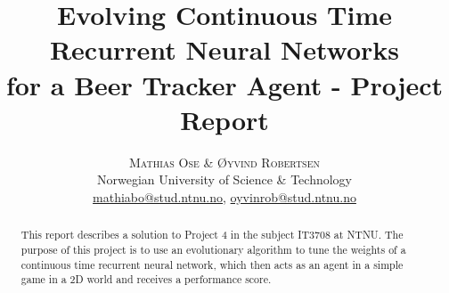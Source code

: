 \documentclass[twoside]{article}
\title{\vspace{-15mm}\fontsize{18pt}{10pt}\selectfont\textbf{Evolving Continuous Time Recurrent Neural Networks\\for a Beer Tracker Agent - Project Report}} %
\author{
    \large
    \textsc{Mathias Ose \& Øyvind Robertsen} \\ %
    \normalsize Norwegian University of Science \& Technology \\ %
    \normalsize \href{mailto:mathiabo@stud.ntnu.no}{mathiabo@stud.ntnu.no}, \href{mailto:oyvinrob@stud.ntnu.no}{oyvinrob@stud.ntnu.no} %
    \vspace{-5mm}
}
\date{}
\begin{document}
\maketitle %

\thispagestyle{fancy} %


\begin{abstract}

    \noindent This report describes a solution to Project 4 in the subject IT3708 at NTNU. 
    The purpose of this project is to use an evolutionary algorithm to tune the weights of a continuous time recurrent neural network, which then acts as an agent in a simple game in a 2D world and receives a performance score.
\end{abstract}

\end{document}
